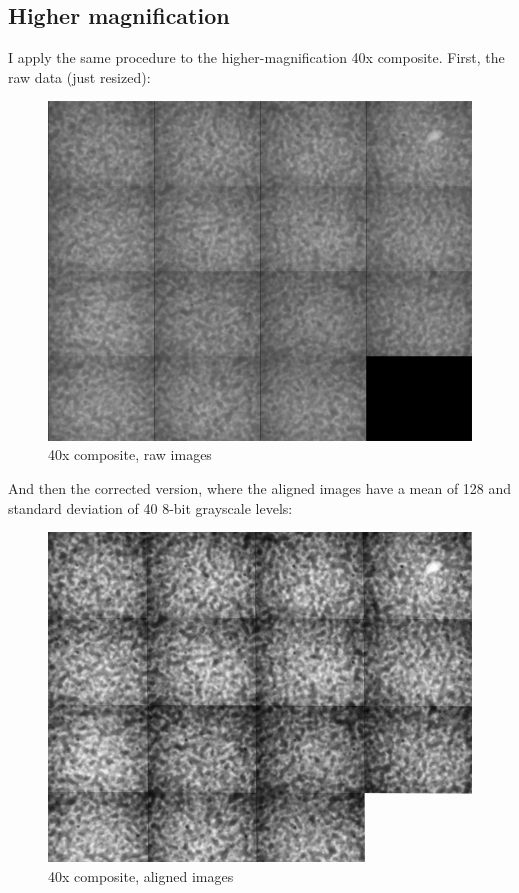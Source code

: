 \subsection{Higher
magnification}\hypertarget{higher-magnification}{}\label{higher-magnification} I apply the same procedure to the higher-magnification 40x composite. First, the
raw data (just resized):
\begin{figure}[h]
\begin{center}
\includegraphics[width=\columnwidth]{./images/2014_07_27_ace_m2_run4_s22_gel/w9s22_40x_60um_days04to15_resize.png}
\end{center}
\caption{40x composite, raw images}
\end{figure}

And then the corrected version, where the aligned images have a mean of 128 and standard deviation of 40 8-bit grayscale levels:
\begin{figure}[h]
\begin{center}
\includegraphics[width=\columnwidth]{./images/2014_07_27_ace_m2_run4_s22_gel/w9s22_40x_60um_days04to15.png}
\end{center}
\caption{40x composite, aligned images}
\end{figure}

